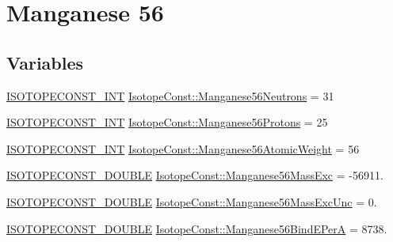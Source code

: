 \hypertarget{group___isotope_const-_manganese-_mn56}{}\section{Manganese 56}
\label{group___isotope_const-_manganese-_mn56}
\subsection*{Variables}
\begin{DoxyCompactItemize}
\item 
\mbox{\hyperlink{group___isotope_const-_macros_ga5f18360b3e99483a35c32d789e62621c}{I\+S\+O\+T\+O\+P\+E\+C\+O\+N\+S\+T\+\_\+\+I\+NT}} \mbox{\hyperlink{group___isotope_const-_manganese-_mn56_gaba69235d93ad4fd325dc299d292aa6ae}{Isotope\+Const\+::\+Manganese56\+Neutrons}} = 31
\item 
\mbox{\hyperlink{group___isotope_const-_macros_ga5f18360b3e99483a35c32d789e62621c}{I\+S\+O\+T\+O\+P\+E\+C\+O\+N\+S\+T\+\_\+\+I\+NT}} \mbox{\hyperlink{group___isotope_const-_manganese-_mn56_ga178fe1c9da412ffa65a692a3d71e90eb}{Isotope\+Const\+::\+Manganese56\+Protons}} = 25
\item 
\mbox{\hyperlink{group___isotope_const-_macros_ga5f18360b3e99483a35c32d789e62621c}{I\+S\+O\+T\+O\+P\+E\+C\+O\+N\+S\+T\+\_\+\+I\+NT}} \mbox{\hyperlink{group___isotope_const-_manganese-_mn56_ga1ab803d9df6e6a6c769b741a987daee7}{Isotope\+Const\+::\+Manganese56\+Atomic\+Weight}} = 56
\item 
\mbox{\hyperlink{group___isotope_const-_macros_ga8f45a7272ce02c0b4c65c44636ed719a}{I\+S\+O\+T\+O\+P\+E\+C\+O\+N\+S\+T\+\_\+\+D\+O\+U\+B\+LE}} \mbox{\hyperlink{group___isotope_const-_manganese-_mn56_ga31b08f8dcbd6c6098d9f5258dcc95f66}{Isotope\+Const\+::\+Manganese56\+Mass\+Exc}} = -\/56911.
\item 
\mbox{\hyperlink{group___isotope_const-_macros_ga8f45a7272ce02c0b4c65c44636ed719a}{I\+S\+O\+T\+O\+P\+E\+C\+O\+N\+S\+T\+\_\+\+D\+O\+U\+B\+LE}} \mbox{\hyperlink{group___isotope_const-_manganese-_mn56_ga33704ccb52d9f35214508bcb2613638c}{Isotope\+Const\+::\+Manganese56\+Mass\+Exc\+Unc}} = 0.
\item 
\mbox{\hyperlink{group___isotope_const-_macros_ga8f45a7272ce02c0b4c65c44636ed719a}{I\+S\+O\+T\+O\+P\+E\+C\+O\+N\+S\+T\+\_\+\+D\+O\+U\+B\+LE}} \mbox{\hyperlink{group___isotope_const-_manganese-_mn56_gab2d1c843cdb0ce2de42d92d5dc3ab01f}{Isotope\+Const\+::\+Manganese56\+Bind\+E\+PerA}} = 8738.
\item 

\end{DoxyCompactItemize}
